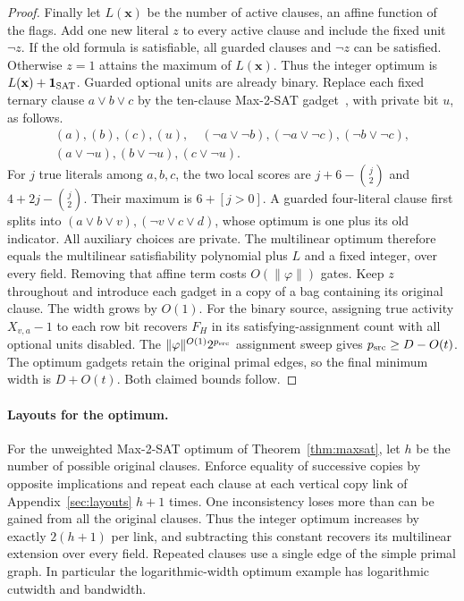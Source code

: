 \documentclass[11pt]{article}
\theoremstyle{definition}
\begin{document}
\begin{proof}
Finally let \(L(\mathbf x)\) be the number of active clauses, an affine function of the flags. Add one new literal \(z\) to every active clause and include the fixed unit \(\neg z\). If the old formula is satisfiable, all guarded clauses and \(\neg z\) can be satisfied. Otherwise \(z=1\) attains the maximum of \(L(\mathbf x)\). Thus the integer optimum is \(L(\mathbf x)+\mathbf1_{\rm SAT}\). Guarded optional units are already binary. Replace each fixed ternary clause \(a\lor b\lor c\) by the ten-clause Max-2-SAT gadget~\cite{garey-maxsat}, with private bit \(u\), as follows.
\[
 \begin{gathered}
 (a),(b),(c),(u),\quad
 (\neg a\lor\neg b),(\neg a\lor\neg c),(\neg b\lor\neg c),\\
 (a\lor\neg u),(b\lor\neg u),(c\lor\neg u).
 \end{gathered}
\]
For \(j\) true literals among \(a,b,c\), the two local scores are \(j+6-\binom j2\) and \(4+2j-\binom j2\). Their maximum is \(6+[j>0]\). A guarded four-literal clause first splits into \((a\lor b\lor v),(\neg v\lor c\lor d)\), whose optimum is one plus its old indicator. All auxiliary choices are private. The multilinear optimum therefore equals the multilinear satisfiability polynomial plus \(L\) and a fixed integer, over every field. Removing that affine term costs \(O(\|\varphi\|)\) gates. Keep \(z\) throughout and introduce each gadget in a copy of a bag containing its original clause. The width grows by \(O(1)\). For the binary source, assigning true activity \(X_{v,a}-1\) to each row bit recovers \(F_H\) in its satisfying-assignment count with all optional units disabled. The \(\|\varphi\|^{O(1)}2^{p_{\rm src}}\) assignment sweep gives \(p_{\rm src}\ge D-O(t)\). The optimum gadgets retain the original primal edges, so the final minimum width is \(D+O(t)\). Both claimed bounds follow.
\end{proof}

\paragraph{Layouts for the optimum.} For the unweighted Max-2-SAT optimum of Theorem~\ref{thm:maxsat}, let \(h\) be the number of possible original clauses. Enforce equality of successive copies by opposite implications and repeat each clause at each vertical copy link of Appendix~\ref{sec:layouts} \(h+1\) times. One inconsistency loses more than can be gained from all the original clauses. Thus the integer optimum increases by exactly \(2(h+1)\) per link, and subtracting this constant recovers its multilinear extension over every field. Repeated clauses use a single edge of the simple primal graph. In particular the logarithmic-width optimum example has logarithmic cutwidth and bandwidth.
\end{document}
